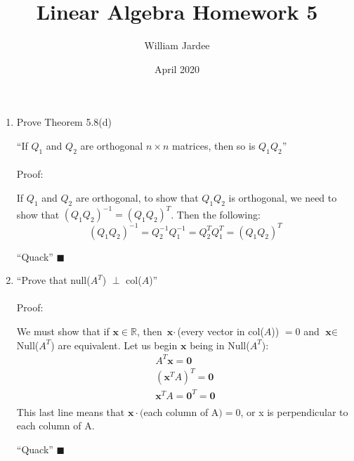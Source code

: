 \documentclass{article}
\title{Linear Algebra Homework 5}
\author{William Jardee}
\date{April 2020}
\newcommand\tab[1][1cm]{\hspace*{#1}}
\begin{document}
\maketitle

\begin{enumerate}


\item 
\tab Prove Theorem 5.8(d)\par
``If $Q_1$ and $Q_2$ are orthogonal $n \times n$ matrices, then so is $Q_1Q_2$''\\\\
Proof:\par
If $Q_1$ and $Q_2$ are orthogonal, to show that $Q_1Q_2$ is orthogonal, we need to show that $(Q_1Q_2)^{-1} = (Q_1Q_2)^T$. Then the following:
$$(Q_1Q_2)^{-1}=Q_2^{-1} Q_1^{-1} = Q_2^T Q_1^T = (Q_1 Q_2)^T$$
\par
{\raggedleft ``Quack''  $\blacksquare$\\}


\item
\tab
``Prove that null($A^T$) $\perp$ col($A$)''\\\\
Proof:\par
We must show that if $\textbf{x}\in \mathbb{R}$, then $\textbf{x} \cdot $(every vector in col($A$)) $= 0$ and $\textbf{x}\in$ Null($A^T$) are equivalent. Let us begin $\textbf{x}$ being in Null($A^T$):
\[
\begin{array}{c}
A^T\textbf{x} = \textbf{0}\\
(\textbf{x}^TA)^T = \textbf{0}\\
\textbf{x}^TA = \textbf{0}^T  = \textbf{0}\\
\end{array}
\]
This last line means that $\textbf{x} \cdot($each column of A$) = 0$, or x is perpendicular to each column of A. 
\par
{\raggedleft ``Quack''  $\blacksquare$\\}



\end{enumerate}
\end{document}
